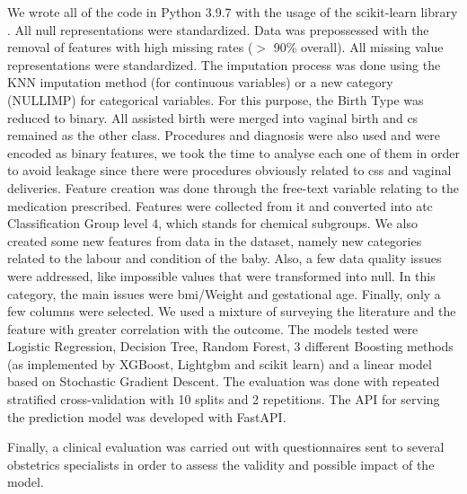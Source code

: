 We wrote all of the code in Python 3.9.7 with the usage of the scikit-learn library \cite{scikit-learn}. All null representations were standardized.  Data was prepossessed with the removal of features with high missing rates ($>$ 90\% overall). All missing value representations were standardized. The imputation process was done using the KNN imputation method (for continuous variables) or a new category (NULLIMP) for categorical variables. 
For this purpose, the Birth Type was reduced to binary. All assisted birth were merged into vaginal birth and \ac{cs} remained as the other class. Procedures and diagnosis were also used and were encoded as binary features, we took the time to analyse each one of them in order to avoid leakage since there were procedures obviously related to \acp{cs} and vaginal deliveries.
Feature creation was done through the free-text variable relating to the medication prescribed. Features were collected from it and converted into \ac{atc} Classification Group level 4, which stands for chemical subgroups. We also created some new features from data in the dataset, namely new categories related to the labour and condition of the baby.
Also, a few data quality issues were addressed, like impossible values that were transformed into null. In this category, the main issues were \ac{bmi}/Weight and gestational age.
Finally, only a few columns were selected. We used a mixture of surveying the literature and the feature with greater correlation with the outcome.
The models tested were Logistic Regression, Decision Tree, Random Forest, 3 different Boosting methods (as implemented by XGBoost, Lightgbm and scikit learn) and a linear model based on Stochastic Gradient Descent.
The evaluation was done with repeated stratified cross-validation with 10 splits and 2 repetitions.
The API for serving the prediction model was developed with FastAPI.

Finally, a clinical evaluation was carried out with questionnaires sent to several obstetrics specialists in order to assess the validity and possible impact of the model.
